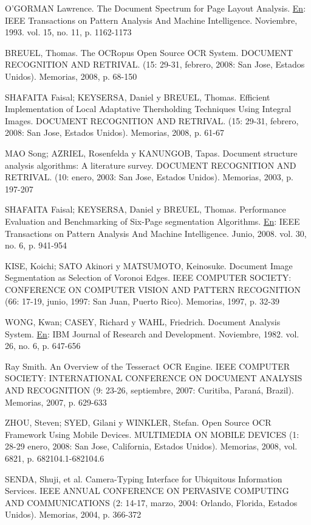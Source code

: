 \documentclass[a4paper, 11pt, oneside]{report}
\begin{document}
	O'GORMAN Lawrence. The Document Spectrum for Page Layout Analysis. \underline{En}: IEEE Transactions on Pattern Analysis And Machine Intelligence. Noviembre, 1993. vol. 15, no. 11, p. 1162-1173
	
	BREUEL, Thomas. The OCRopus Open Source OCR System. DOCUMENT RECOGNITION AND RETRIVAL. (15: 29-31, febrero, 2008: San Jose, Estados Unidos). Memorias, 2008, p. 68-150
	
	SHAFAITA Faisal; KEYSERSA, Daniel y BREUEL, Thomas. Efficient Implementation of Local Adaptative Thersholding Techniques Using Integral Images. DOCUMENT RECOGNITION AND RETRIVAL. (15: 29-31, febrero, 2008: San Jose, Estados Unidos). Memorias, 2008, p. 61-67
	
	MAO Song; AZRIEL, Rosenfelda y KANUNGOB, Tapas. Document structure analysis algorithms: A literature survey. DOCUMENT RECOGNITION AND RETRIVAL. (10: enero, 2003: San Jose, Estados Unidos). Memorias, 2003, p. 197-207
	
	SHAFAITA Faisal; KEYSERSA, Daniel y BREUEL, Thomas. Performance Evaluation and Benchmarking of Six-Page segmentation Algorithms. \underline{En}: IEEE Transactions on Pattern Analysis And Machine Intelligence. Junio, 2008. vol. 30, no. 6, p. 941-954
	
	KISE, Koichi; SATO Akinori y MATSUMOTO, Keinosuke. Document Image Segmentation as Selection of Voronoi Edges. IEEE COMPUTER SOCIETY: CONFERENCE ON COMPUTER VISION AND PATTERN RECOGNITION (66: 17-19, junio, 1997: San Juan, Puerto Rico). Memorias, 1997, p. 32-39
	
	WONG, Kwan; CASEY, Richard y WAHL, Friedrich. Document Analysis System. \underline{En}: IBM Journal of Research and Development. Noviembre, 1982. vol. 26, no. 6, p. 647-656
	
	Ray Smith. An Overview of the Tesseract OCR Engine. IEEE COMPUTER SOCIETY: INTERNATIONAL CONFERENCE ON DOCUMENT ANALYSIS AND RECOGNITION (9: 23-26, septiembre, 2007: Curitiba, Paraná, Brazil). Memorias, 2007, p. 629-633
	
	ZHOU, Steven; SYED, Gilani y WINKLER, Stefan. Open Source OCR Framework Using Mobile Devices. MULTIMEDIA ON MOBILE DEVICES (1: 28-29 enero, 2008: San Jose, California, Estados Unidos). Memorias, 2008, vol. 6821, p. 682104.1-682104.6
	
	SENDA, Shuji, et al. Camera-Typing Interface for Ubiquitous Information Services. IEEE ANNUAL CONFERENCE ON PERVASIVE COMPUTING AND COMMUNICATIONS (2: 14-17, marzo, 2004: Orlando, Florida, Estados Unidos). Memorias, 2004, p. 366-372
	
\end{document}
